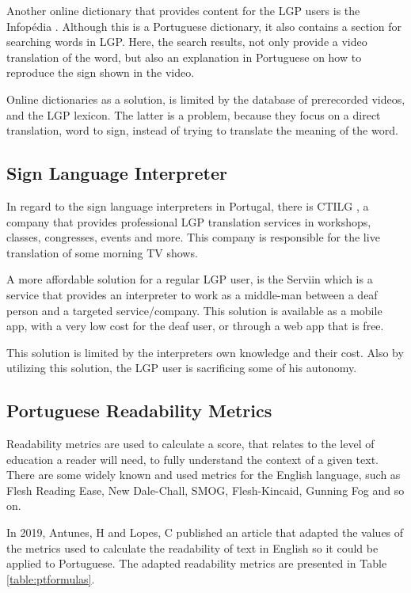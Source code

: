 \documentclass[runningheads]{llncs}
\begin{document}
Another online dictionary that provides content for the LGP users is the Infopédia \cite{infopedia_2020}.
Although this is a Portuguese dictionary, it also contains a section for searching words in LGP.
Here, the search results, not only provide a video translation of the word, but also an explanation in Portuguese on how to reproduce the sign shown in the video.

Online dictionaries as a solution, is limited by the database of prerecorded videos, and the LGP lexicon.
The latter is a problem, because they focus on a direct translation, word to sign, instead of trying to translate the meaning of the word.

\subsection{Sign Language Interpreter}

In regard to the sign language interpreters in Portugal, there is CTILG \cite{ctilg_2020}, a company that provides professional LGP translation services in workshops, classes, congresses, events and more.
This company is responsible for the live translation of some morning TV shows.

A more affordable solution for a regular LGP user, is the Serviin \cite{serviin_2020} which is a service that provides an interpreter to work as a middle-man between a deaf person and a targeted service/company.
This solution is available as a mobile app, with a very low cost for the deaf user, or through a  web app that is free.

This solution is limited by the interpreters own knowledge and their cost.
Also by utilizing this solution, the LGP user is sacrificing some of his autonomy.

\subsection{Portuguese Readability Metrics}

Readability metrics are used to calculate a score\cite{readability}, that relates to the level of education a reader will need, to fully understand the context of a given text.
There are some widely known and used metrics for the English language, such as Flesh Reading Ease, New Dale-Chall, SMOG, Flesh-Kincaid, Gunning Fog and so on.

In 2019, Antunes, H and Lopes, C published an article \cite{ptread_2019} that adapted the values of the metrics used to calculate the readability of text in English so it could be applied to Portuguese.
The adapted readability metrics are presented in Table \ref{table:ptformulas}.
\end{document}
